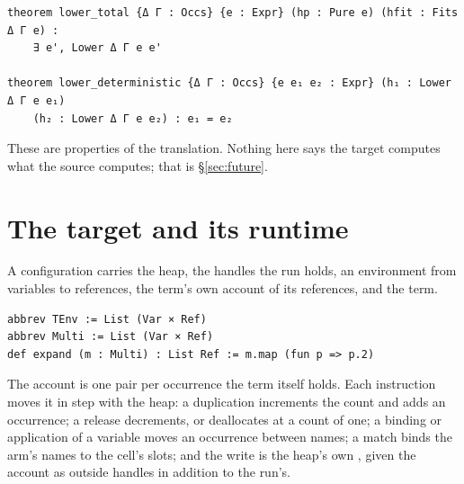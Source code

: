 \documentclass[11pt]{article}
\newcommand{\code}[1]{\texttt{\detokenize{#1}}}
\newcommand{\lref}[1]{\code{#1}}
\theoremstyle{remark}
\begin{document}
\begin{lstlisting}
theorem lower_total {Δ Γ : Occs} {e : Expr} (hp : Pure e) (hfit : Fits Δ Γ e) :
    ∃ e', Lower Δ Γ e e'

theorem lower_deterministic {Δ Γ : Occs} {e e₁ e₂ : Expr} (h₁ : Lower Δ Γ e e₁)
    (h₂ : Lower Δ Γ e e₂) : e₁ = e₂
\end{lstlisting}

\noindent These are properties of the translation. Nothing here says the target
computes what the source computes; that is \S\ref{sec:future}.

\section{The target and its runtime}
\label{sec:target}

\noindent A configuration carries the heap, the handles the run holds, an
environment from variables to references, the term's own account of its references,
and the term.

\begin{lstlisting}
abbrev TEnv := List (Var × Ref)
abbrev Multi := List (Var × Ref)
def expand (m : Multi) : List Ref := m.map (fun p => p.2)
\end{lstlisting}

\noindent The account is one pair per occurrence the term itself holds. Each
instruction moves it in step with the heap: a duplication increments the count and
adds an occurrence; a release decrements, or deallocates at a count of one; a
binding or application of a variable moves an occurrence between names; a match
binds the arm's names to the cell's slots; and the write is the heap's own
\lref{update}, given the account as outside handles in addition to the run's.
\end{document}
